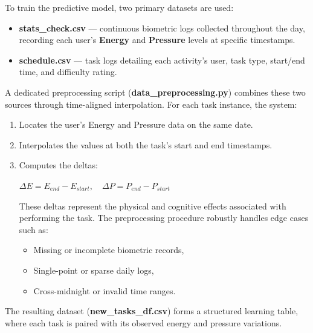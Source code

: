 \documentclass[12pt, a4paper]{article}
\begin{document}
            To train the predictive model, two primary datasets are used:
    
            \begin{itemize}
                \item \textbf{stats\_check.csv} — continuous biometric logs collected throughout the day, recording each user’s \textbf{Energy} and \textbf{Pressure} levels at specific timestamps.
                \item \textbf{schedule.csv} — task logs detailing each activity’s user, task type, start/end time, and difficulty rating.
            \end{itemize}
    
            A dedicated preprocessing script (\textbf{data\_preprocessing.py}) combines these two sources through time-aligned interpolation. For each task instance, the system:
    
            \begin{enumerate}
                \item Locates the user’s Energy and Pressure data on the same date.
                \item Interpolates the values at both the task’s start and end timestamps.
                \item Computes the deltas:
                        
                    \begin{center}
                        $\Delta E = E_{end} - E_{start}, \quad \Delta P = P_{end} - P_{start}$
                    \end{center}
            
                    These deltas represent the physical and cognitive effects associated with performing the task.  
                    The preprocessing procedure robustly handles edge cases such as:
                    
                    \begin{itemize}
                        \item Missing or incomplete biometric records,
                        \item Single-point or sparse daily logs,
                        \item Cross-midnight or invalid time ranges.
                    \end{itemize}
            \end{enumerate}
    
            The resulting dataset (\textbf{new\_tasks\_df.csv}) forms a structured learning table, where each task is paired with its observed energy and pressure variations.
    
\end{document}
